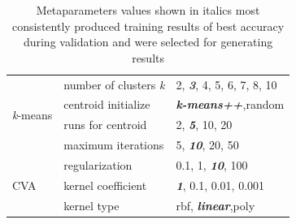 \documentclass[a4paper, 11pt]{article}
\begin{document}
\begin{table}
\begin{center}
\begin{tabular}{l|l|l}
  \hline
  \multirow{4}{*}{\textit{k}-means} & number of clusters \textit{k}  & 2, \textit{\textbf{3}}, 4, 5, 6, 7, 8, 10\\
                                    & centroid initialize         & \textit{\textbf{k-means++}},random\\
                                    & runs for centroid	     & 2, \textit{\textbf{5}}, 10, 20 \\
                                    & maximum iterations           & 5, \textit{\textbf{10}}, 20, 50 \\
  \hline
    \multirow{3}{*}{CVA}            & regularization   & 0.1, 1, \textit{\textbf{10}}, 100 \\
                                    & kernel coefficient      & \textit{\textbf{1}}, 0.1, 0.01, 0.001 \\
                                    & kernel type                  & rbf, \textit{\textbf{linear}},poly \\
  \hline
  \end{tabular}
  \vspace{-2\baselineskip} %
  \end{center} 
  \caption{\centering\linespread{0.8}\selectfont Metaparameters values shown in italics most consistently produced training results of 
  best accuracy during validation and were selected for generating results}
  \vspace{-1\baselineskip} %
  \label{tab:metaparameters}
\end{table} 
\end{document}

